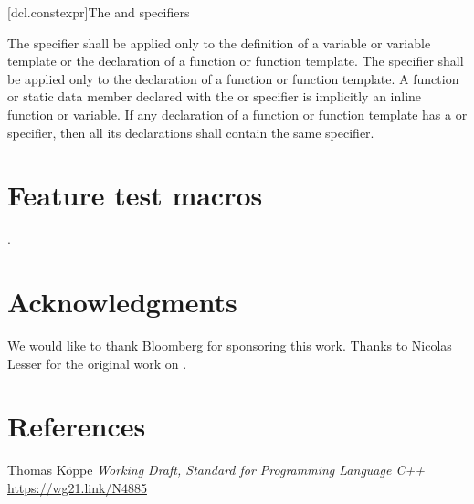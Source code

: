 \documentclass{wg21}
\begin{document}
[dcl.constexpr]{The  and  specifiers}%

\pnum
The  specifier shall be applied only to
the definition of a variable or variable template or
the declaration of a function or function template.
The  specifier shall be applied only to
the declaration of a function or function template.
A function or static data member
declared with the  or  specifier
is implicitly an inline function or variable.
If any declaration of a function or function template has
a  or  specifier,
then all its declarations shall contain the same specifier.


\section{Feature test macros}

.


\section{Acknowledgments}

We would like to thank Bloomberg for sponsoring this work.
Thanks to Nicolas Lesser for the original work on .

\section{References}

\renewcommand{\section}[2]{}%



\begin{thebibliography}{9}

Thomas Köppe
\emph{Working Draft, Standard for Programming Language C++}\newline
\url{https://wg21.link/N4885}


\end{thebibliography}
\end{document}
